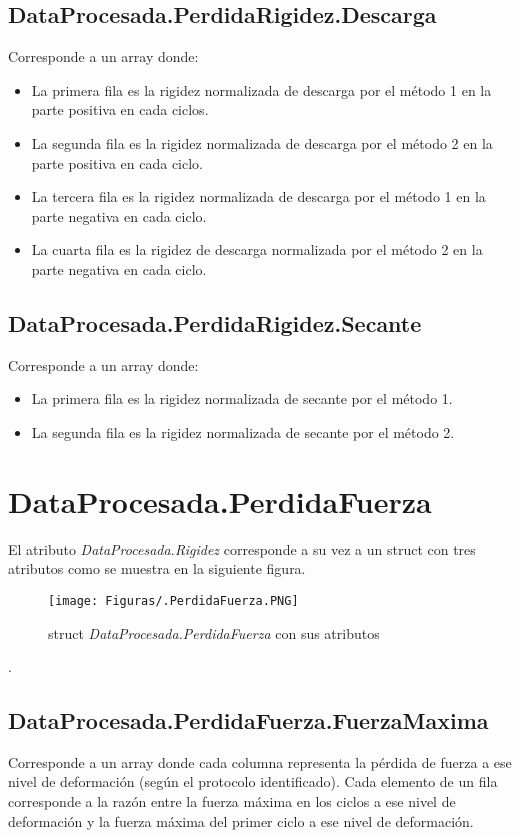 \documentclass[a4paper, 11pt,article,oneside]{memoir}%
\begin{document}
\section{DataProcesada.PerdidaRigidez.Descarga}
Corresponde a un array donde: 
\begin{itemize}
    \item La primera fila es la rigidez normalizada de descarga por el método 1 en la parte positiva en cada ciclos.
    \item  La segunda fila es la rigidez normalizada de descarga por el método 2 en la parte positiva en cada ciclo.
     \item  La tercera fila es la rigidez normalizada de descarga por el método 1 en la parte negativa en cada ciclo.
     \item  La cuarta fila es la rigidez de descarga normalizada por el método 2 en la parte negativa en cada ciclo.
\end{itemize}
\section{DataProcesada.PerdidaRigidez.Secante}
Corresponde a un array donde: 
\begin{itemize}
    \item La primera fila es la rigidez normalizada de secante por el método 1.
    \item  La segunda fila es la rigidez normalizada de secante por el método 2.
\end{itemize}
\newpage
\chapter{DataProcesada.PerdidaFuerza}
El atributo \textit{DataProcesada.Rigidez} corresponde a su vez a un struct con tres atributos como se muestra en la siguiente figura.

\begin{figure}[H]
    \centering
    \texttt{[image: Figuras/.PerdidaFuerza.PNG]}
    \caption{struct \textit{DataProcesada.PerdidaFuerza} con sus atributos}
    \label{fig:first resumen e5 }
\end{figure}.
\section{DataProcesada.PerdidaFuerza.FuerzaMaxima}
Corresponde a un array donde cada columna representa la pérdida de fuerza a ese nivel de deformación (según el protocolo identificado). Cada elemento de un fila corresponde a la razón entre la fuerza máxima en los ciclos a ese nivel de deformación y la fuerza máxima del primer ciclo a ese nivel de deformación.
\end{document}
